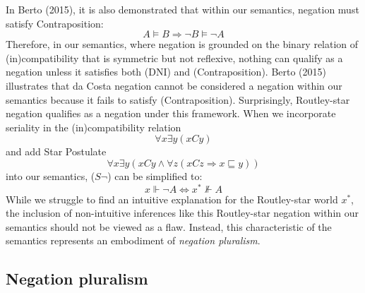 In Berto (2015), it is also demonstrated that within our semantics, negation must satisfy Contraposition:
\begin{equation}
    A \vDash B \Rightarrow \neg B \vDash \neg A \tag{Contraposition}
\end{equation}
Therefore, in our semantics, where negation is grounded on the binary relation of (in)compatibility that is symmetric but not reflexive, nothing can qualify as a negation unless it satisfies both (DNI) and (Contraposition). Berto (2015) illustrates that da Costa negation cannot be considered a negation within our semantics because it fails to satisfy (Contraposition). Surprisingly, Routley-star negation qualifies as a negation under this framework. When we incorporate seriality in the (in)compatibility relation
\begin{equation}
    \forall x \exists y (xCy) \tag{Seriality}
\end{equation}
and add Star Postulate
\begin{equation}
    \forall x \exists y (xCy \land \forall z (xCz \Rightarrow x \sqsubseteq y)) \tag{Star Postulate}
\end{equation}
into our semantics, ($S\neg$) can be simplified to:
\begin{equation}
    x \Vdash \neg A \iff x^* \not\Vdash A \tag{S*}
\end{equation}
While we struggle to find an intuitive explanation for the Routley-star world $x^*$, the inclusion of non-intuitive inferences like this Routley-star negation within our semantics should not be viewed as a flaw. Instead, this characteristic of the semantics represents an embodiment of \textit{negation pluralism}.

\subsection{Negation pluralism}

